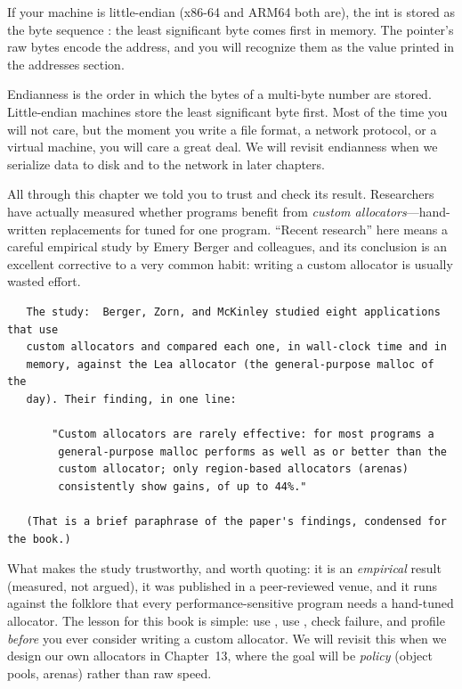 If your machine is little-endian (x86-64 and ARM64 both are), the int
 is stored as the byte sequence :
the least significant byte comes first in memory. The pointer's raw
bytes encode the address, and you will recognize them as the value
 printed in the addresses section.

\begin{insight}[Endianness]
Endianness is the order in which the bytes of a multi-byte number are
stored. Little-endian machines store the least significant byte first.
Most of the time you will not care, but the moment you write a file
format, a network protocol, or a virtual machine, you will care a great
deal. We will revisit endianness when we serialize data to disk and to
the network in later chapters.
\end{insight}

\begin{researchnote}
All through this chapter we told you to trust  and check
its result. Researchers have actually measured whether programs benefit
from \emph{custom allocators}---hand-written replacements for
 tuned for one program. ``Recent research'' here means a
careful empirical study by Emery Berger and colleagues, and its
conclusion is an excellent corrective to a very common habit: writing a
custom allocator is usually wasted effort.

\begin{verbatim}
   The study:  Berger, Zorn, and McKinley studied eight applications that use
   custom allocators and compared each one, in wall-clock time and in
   memory, against the Lea allocator (the general-purpose malloc of the
   day). Their finding, in one line:

       "Custom allocators are rarely effective: for most programs a
        general-purpose malloc performs as well as or better than the
        custom allocator; only region-based allocators (arenas)
        consistently show gains, of up to 44%."

   (That is a brief paraphrase of the paper's findings, condensed for the book.)
\end{verbatim}

What makes the study trustworthy, and worth quoting: it is an
\emph{empirical} result (measured, not argued), it was published in a
peer-reviewed venue, and it runs against the folklore that every
performance-sensitive program needs a hand-tuned allocator. The lesson
for this book is simple: use , use , check
failure, and profile \emph{before} you ever consider writing a custom
allocator. We will revisit this when we design our own allocators in
Chapter~13, where the goal will be \emph{policy} (object pools, arenas)
rather than raw speed.

\end{researchnote}

